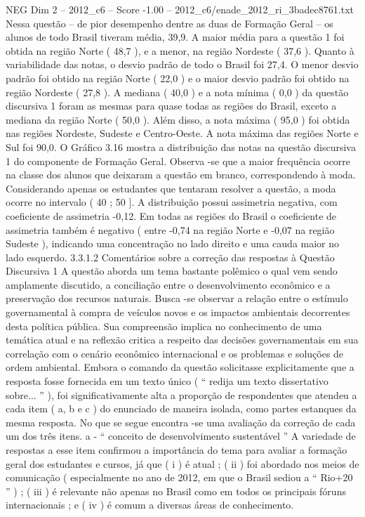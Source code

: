 \begin{textsample}{NEG Dim 2 – 2012\_c6 – Score -1.00 – 2012\_c6/enade\_2012\_ri\_3badec8761.txt}
Nessa questão – de pior desempenho dentre as duas de Formação Geral – os alunos de todo Brasil tiveram média, 39,9.
A maior média para a questão 1 foi obtida na região Norte ( 48,7 ), e a menor, na região Nordeste ( 37,6 ).
Quanto à variabilidade das notas, o desvio padrão de todo o Brasil foi 27,4.
O menor desvio padrão foi obtido na região Norte ( 22,0 ) e o maior desvio padrão foi obtido na região Nordeste ( 27,8 ).
A mediana ( 40,0 ) e a nota mínima ( 0,0 ) da questão discursiva 1 foram as mesmas para quase todas as regiões do Brasil, exceto a mediana da região Norte ( 50,0 ).
Além disso, a nota máxima ( 95,0 ) foi obtida nas regiões Nordeste, Sudeste e Centro-Oeste.
A nota máxima das regiões Norte e Sul foi 90,0.
O Gráfico 3.16 mostra a distribuição das notas na questão discursiva 1 do componente de Formação Geral.
Observa -se que a maior frequência ocorre na classe dos alunos que deixaram a questão em branco, correspondendo à moda.
Considerando apenas os estudantes que tentaram resolver a questão, a moda ocorre no intervalo ( 40 ; 50 ].
A distribuição possui assimetria negativa, com coeficiente de assimetria -0,12.
Em todas as regiões do Brasil o coeficiente de assimetria também é negativo ( entre -0,74 na região Norte e -0,07 na região Sudeste ), indicando uma concentração no lado direito e uma cauda maior no lado esquerdo. 3.3.1.2 Comentários sobre a correção das respostas à Questão Discursiva 1 A questão aborda um tema bastante polêmico o qual vem sendo amplamente discutido, a conciliação entre o desenvolvimento econômico e a preservação dos recursos naturais.
Busca -se observar a relação entre o estímulo governamental à compra de veículos novos e os impactos ambientais decorrentes desta política pública.
Sua compreensão implica no conhecimento de uma temática atual e na reflexão critica a respeito das decisões governamentais em sua correlação com o cenário econômico internacional e os problemas e soluções de ordem ambiental.
Embora o comando da questão solicitasse explicitamente que a resposta fosse fornecida em um texto único ( “ redija um texto dissertativo sobre... ” ), foi significativamente alta a proporção de respondentes que atendeu a cada item ( a, b e c ) do enunciado de maneira isolada, como partes estanques da mesma resposta.
No que se segue encontra -se uma avaliação da correção de cada um dos três itens. a - “ conceito de desenvolvimento sustentável ” A variedade de respostas a esse item confirmou a importância do tema para avaliar a formação geral dos estudantes e cursos, já que ( i ) é atual ; ( ii ) foi abordado nos meios de comunicação ( especialmente no ano de 2012, em que o Brasil sediou a “ Rio+20 ” ) ; ( iii ) é relevante não apenas no Brasil como em todos os principais fóruns internacionais ; e ( iv ) é comum a diversas áreas de conhecimento.

\end{textsample}
